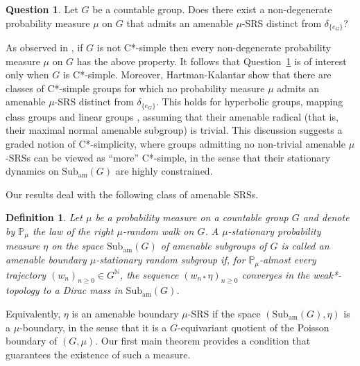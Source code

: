 \documentclass[reqno,a4paper,11pt]{amsart}
\numberwithin{equation}{section}
\newcommand{\1}{\mathbf{1}}
\def\N{{\mathbb N}}
\def\P{{\mathbb P}}
\newcommand{\subam}[1]{\mathrm{Sub}_{\mathrm{am}}(#1)}
\newtheorem{defn}[teo]{Definition}
\theoremstyle{definition}
\newtheorem{qnnum}{Question}
\begin{document}
\begin{qnnum}\label{question: main question}
	Let $G$ be a countable group. Does there exist a non-degenerate probability measure $\mu$ on $G$ that admits an amenable $\mu$-SRS distinct from $\delta_{\{e_G\}}$?
\end{qnnum}
As observed in \cite{HartmanKalantar2022}, if $G$ is not C*-simple then every non-degenerate probability measure $\mu$ on $G$ has the above property. It follows that Question~\ref{question: main question} is of interest only when $G$ is C*-simple. Moreover, Hartman-Kalantar show that there are classes of C*-simple groups for which no probability measure $\mu$ admits an amenable $\mu$-SRS distinct from $\delta_{\{e_G\}}$. This holds for hyperbolic groups, mapping class groups and linear groups \cite[Theorems 4.12, 6.5 \& 6.7, Example 6.6]{HartmanKalantar2022}, assuming that their amenable radical (that is, their maximal normal amenable subgroup) is trivial. This discussion suggests a graded notion of C*-simplicity, where groups admitting no non-trivial amenable $\mu$-SRSs can be viewed as “more” C*-simple, in the sense that their stationary dynamics on $\mathrm{Sub}_\mathrm{am}(G)$ are highly constrained.

Our results deal with the following class of amenable SRSs.

\begin{defn}\label{def: boundary SRS}
	Let $\mu$ be a probability measure on a countable group $G$ and denote by $\P_{\mu}$ the law of the right $\mu$-random walk on $G$. A $\mu$-stationary probability measure $\eta$ on the space $\subam{G}$ of amenable subgroups of $G$ is called an \emph{amenable boundary $\mu$-stationary random subgroup} if, for $\P_{\mu}$-almost every trajectory $(w_n)_{n\ge 0}\in G^\N$, the sequence $\left(w_{n \ast} \eta\right)_{n\ge 0}$ converges in the weak*-topology to a Dirac mass in $\mathrm{Sub}_\mathrm{am}(G)$.
\end{defn}

Equivalently,  $\eta$ is an amenable boundary $\mu$-SRS if the space $(\subam{G},\eta)$ is a $\mu$-boundary, in the sense that it is a $G$-equivariant quotient of the Poisson boundary of $(G,\mu)$. Our first main theorem provides a condition that guarantees the existence of such a measure.
\end{document}
